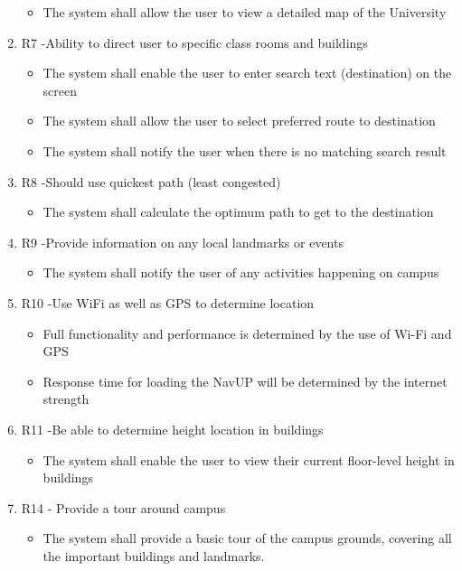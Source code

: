 \documentclass[a4paper, 12pt, one column, aas_macros]{article}
\begin{document}
\begin{enumerate}
\begin{itemize}
\item The system shall allow the user to view a detailed map of the University
\end{itemize}

\item R7 -Ability to direct user to specific class rooms and buildings

\begin{itemize}
\item The system shall enable the user to enter search text (destination) on the screen
\item The system shall allow the user to select preferred route to destination
\item The system shall notify the user when there is no matching search result
\end{itemize}

\item R8 -Should use quickest path (least congested)

\begin{itemize}
\item The system shall calculate the optimum path to get to the destination
\end{itemize}

\item R9 -Provide information on any local landmarks or events

\begin{itemize}
\item The system shall notify the user of any activities happening on campus
\end{itemize}

\item R10 -Use WiFi as well as GPS to determine location

\begin{itemize}
\item Full functionality and performance is determined by the use of Wi-Fi and GPS 
\item Response time for loading the NavUP will be determined by the internet strength
\end{itemize}

\item R11 -Be able to determine height location in buildings

\begin{itemize}
\item The system shall enable the user to view their current floor-level height in buildings
\end{itemize}

\item R14 - Provide a tour around campus
\begin{itemize}
\item The system shall provide a basic tour of the campus grounds, covering all the important buildings and landmarks.
\end{itemize}

\end{enumerate}
\end{document}
